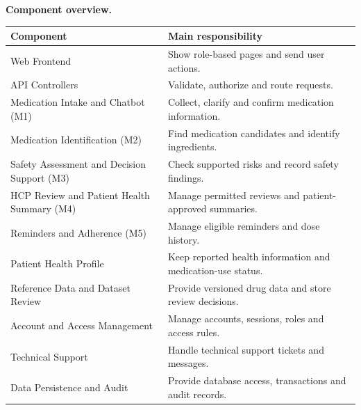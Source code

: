 \noindent\textbf{Component overview.}\par\smallskip
\begingroup\small\renewcommand{\arraystretch}{1.08}
\begin{tabularx}{\textwidth}{|L{0.43\textwidth}|Y|}
\hline
\textbf{Component} & \textbf{Main responsibility} \\ \hline
Web Frontend & Show role-based pages and send user actions. \\ \hline
API Controllers & Validate, authorize and route requests. \\ \hline
Medication Intake and Chatbot (M1) & Collect, clarify and confirm medication information. \\ \hline
Medication Identification (M2) & Find medication candidates and identify ingredients. \\ \hline
Safety Assessment and Decision Support (M3) & Check supported risks and record safety findings. \\ \hline
HCP Review and Patient Health Summary (M4) & Manage permitted reviews and patient-approved summaries. \\ \hline
Reminders and Adherence (M5) & Manage eligible reminders and dose history. \\ \hline
Patient Health Profile & Keep reported health information and medication-use status. \\ \hline
Reference Data and Dataset Review & Provide versioned drug data and store review decisions. \\ \hline
Account and Access Management & Manage accounts, sessions, roles and access rules. \\ \hline
Technical Support & Handle technical support tickets and messages. \\ \hline
Data Persistence and Audit & Provide database access, transactions and audit records. \\ \hline
\end{tabularx}
\endgroup

